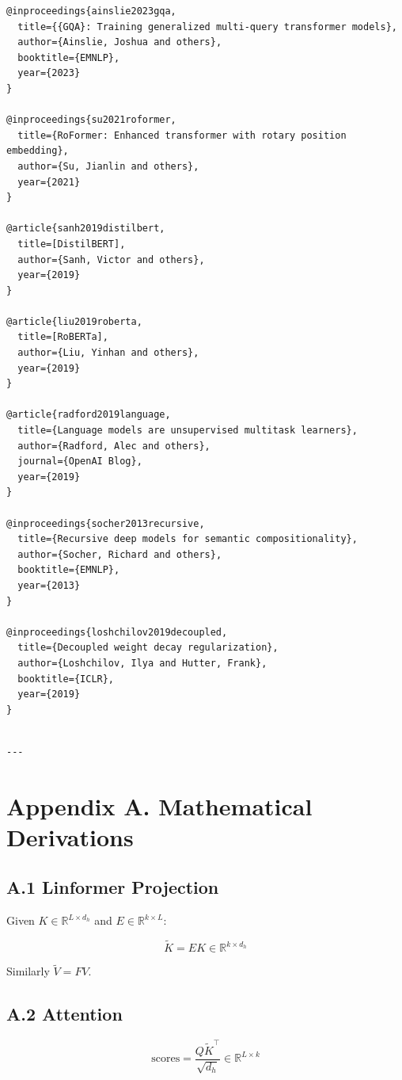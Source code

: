 \begin{lstlisting}
@inproceedings{ainslie2023gqa,
  title={{GQA}: Training generalized multi-query transformer models},
  author={Ainslie, Joshua and others},
  booktitle={EMNLP},
  year={2023}
}

@inproceedings{su2021roformer,
  title={RoFormer: Enhanced transformer with rotary position embedding},
  author={Su, Jianlin and others},
  year={2021}
}

@article{sanh2019distilbert,
  title=[DistilBERT],
  author={Sanh, Victor and others},
  year={2019}
}

@article{liu2019roberta,
  title=[RoBERTa],
  author={Liu, Yinhan and others},
  year={2019}
}

@article{radford2019language,
  title={Language models are unsupervised multitask learners},
  author={Radford, Alec and others},
  journal={OpenAI Blog},
  year={2019}
}

@inproceedings{socher2013recursive,
  title={Recursive deep models for semantic compositionality},
  author={Socher, Richard and others},
  booktitle={EMNLP},
  year={2013}
}

@inproceedings{loshchilov2019decoupled,
  title={Decoupled weight decay regularization},
  author={Loshchilov, Ilya and Hutter, Frank},
  booktitle={ICLR},
  year={2019}
}
\end{lstlisting}
\begin{lstlisting}

---
\end{lstlisting}

\section{Appendix A. Mathematical Derivations}

\subsection{A.1 Linformer Projection}

Given $K \in \mathbb{R}^{L \times d_h}$ and $E \in \mathbb{R}^{k \times L}$:

\[
\tilde{K} = E K \in \mathbb{R}^{k \times d_h}
\tag{A.1}
\]

Similarly $\tilde{V} = F V$.

\subsection{A.2 Attention}

\[
\text{scores} = \frac{Q \tilde{K}^\top}{\sqrt{d_h}} \in \mathbb{R}^{L \times k}
\tag{A.2}
\]

